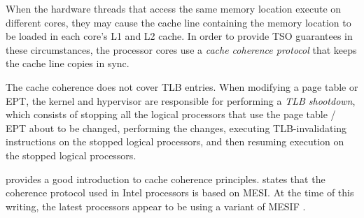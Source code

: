 When the hardware threads that access the same memory location execute on
different cores, they may cause the cache line containing the memory location
to be loaded in each core's L1 and L2 cache. In order to provide TSO guarantees
in these circumstances, the processor cores use a \textit{cache coherence
protocol} that keeps the cache line copies in sync.


The cache coherence does not cover TLB entries. When modifying a page table
or EPT, the kernel and hypervisor are responsible for performing a
\textit{TLB shootdown}, which consists of stopping all the logical processors
that use the page table / EPT about to be changed, performing the changes,
executing TLB-invalidating instructions on the stopped logical processors, and
then resuming execution on the stopped logical processors.

\cite{hennessy2012architecture} provides a good introduction to cache coherence
principles. \cite{intel2014manual} states that the coherence protocol used in
Intel processors is based on MESI. At the time of this writing, the latest
processors appear to be using a variant of MESIF \cite{goodman2009mesif}.
